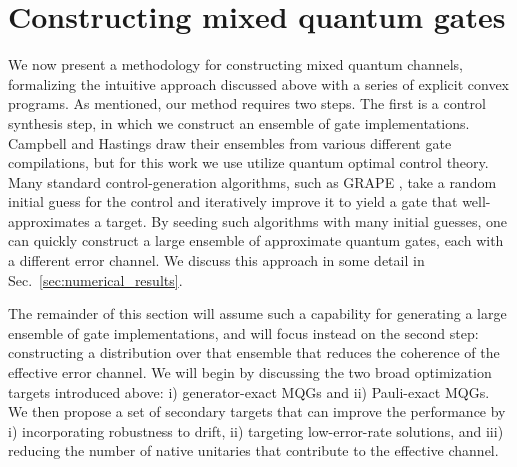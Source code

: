 \documentclass[aps,nofootinbib,pra,notitlepage,twocolumn]{revtex4-1}
\newcommand{\kcy}[1]{{\color{red}[#1]\textsubscript{\rm{KCY}}}}
\newcommand{\0}{\ensuremath{\mathbf{0}}}
\begin{document}



\section{Constructing mixed quantum gates}
\label{sec:mixed_unitary_processes}
\noindent We now present a methodology for constructing mixed quantum channels, formalizing the intuitive approach discussed above with a series of explicit convex programs. As mentioned, our method requires two steps. The first is a control synthesis step, in which we construct an ensemble of gate implementations. Campbell and Hastings draw their ensembles from various different gate compilations, but for this work we use utilize quantum optimal control theory. Many standard control-generation algorithms, such as GRAPE \cite{Khaneja2005}, take a random initial guess for the control and iteratively improve it to yield a gate that well-approximates a target. By seeding such algorithms with many initial guesses, one can quickly construct a large ensemble of approximate quantum gates, each with a different error channel. We discuss this approach in some detail in Sec.~\ref{sec:numerical_results}. 

The remainder of this section will assume such a capability for generating a large ensemble of gate implementations, and will focus instead on the second step: constructing a distribution over that ensemble that reduces the coherence of the effective error channel. We will begin by discussing the two broad optimization targets introduced above: i) generator-exact MQGs and ii) Pauli-exact MQGs. We then propose a set of secondary targets that can improve the performance by i) incorporating robustness to drift, ii) targeting low-error-rate solutions, and iii) reducing the number of native unitaries that contribute to the effective channel. 

\end{document}
